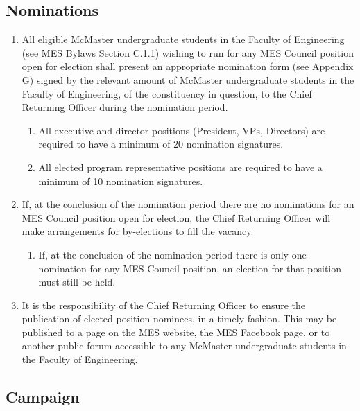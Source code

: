 \subsection{Nominations}
\label{nominations}
\begin{enumerate}
 \item
  All eligible McMaster undergraduate students in the Faculty of Engineering (see MES Bylaws Section C.1.1) wishing to run for any MES Council position open for election shall present an appropriate nomination form (see Appendix G) signed by the relevant amount of McMaster undergraduate students in the Faculty of Engineering, of the constituency in question, to the Chief Returning Officer during the nomination period.
  \begin{enumerate}
   \item
    All executive and director positions (President, VPs, Directors) are required to have a minimum of 20 nomination signatures.
   \item
    All elected program representative positions are required to have a minimum of 10 nomination signatures.
  \end{enumerate}
 \item
  If, at the conclusion of the nomination period there are no nominations for an MES Council position open for election, the Chief Returning Officer will make arrangements for by-elections to fill the vacancy.

  \begin{enumerate}
   \item
    If, at the conclusion of the nomination period there is only one nomination for any MES Council position, an election for that position must still be held.
  \end{enumerate}
 \item
  It is the responsibility of the Chief Returning Officer to ensure the publication of elected position nominees, in a timely fashion. This may be published to a page on the MES website, the MES Facebook page, or to another public forum accessible to any McMaster undergraduate students in the Faculty of Engineering.

\end{enumerate}

\subsection{Campaign}
\label{campaign}


